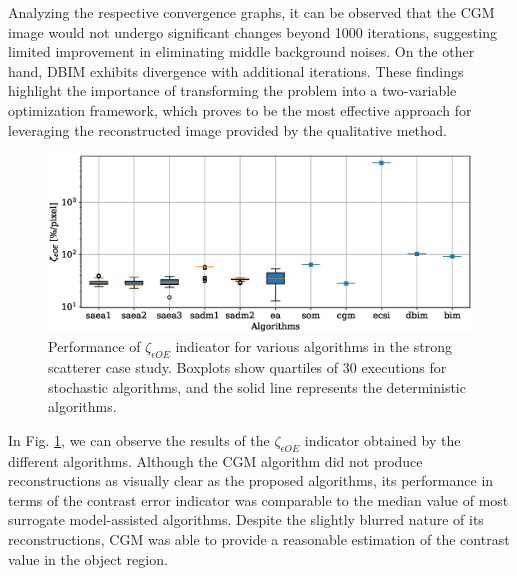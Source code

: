 			Analyzing the respective convergence graphs, it can be observed that the CGM image would not undergo significant changes beyond 1000 iterations, suggesting limited improvement in eliminating middle background noises. On the other hand, DBIM exhibits divergence with additional iterations. These findings highlight the importance of transforming the problem into a two-variable optimization framework, which proves to be the most effective approach for leveraging the reconstructed image provided by the qualitative method.
		
			\begin{figure}
				\centering
				\includegraphics[width=.9\textwidth]{./figuras/casestudy/strong/boxplot_zeta_eoe}
				\caption[Performance of $\zeta_{\epsilon OE}$ indicator for various algorithms in the strong scatterer case study.]{Performance of $\zeta_{\epsilon OE}$ indicator for various algorithms in the strong scatterer case study. Boxplots show quartiles of 30 executions for stochastic algorithms, and the solid line represents the deterministic algorithms.}
				\label{fig:results:casestudy:strong:boxplot:zeta_eoe}
			\end{figure}
		
			
			In Fig. \ref{fig:results:casestudy:strong:boxplot:zeta_eoe}, we can observe the results of the $\zeta_{\epsilon OE}$ indicator obtained by the different algorithms. Although the CGM algorithm did not produce reconstructions as visually clear as the proposed algorithms, its performance in terms of the contrast error indicator was comparable to the median value of most surrogate model-assisted algorithms. Despite the slightly blurred nature of its reconstructions, CGM was able to provide a reasonable estimation of the contrast value in the object region.
			
